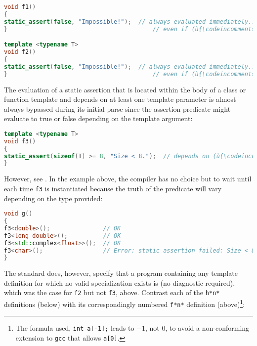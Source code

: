 \begin{lstlisting}[language=C++]
void f1()
{
static_assert(false, "Impossible!");  // always evaluated immediately...
}                                         // even if (ù{\codeincomments{f1()}}ù) is never invoked

template <typename T>
void f2()
{
static_assert(false, "Impossible!");  // always evaluated immediately...
}                                         // even if (ù{\codeincomments{f2()}}ù) is never instantiated
\end{lstlisting}

\noindent The evaluation of a static assertion that is located within the
body of a class or function template and depends on at least one
template parameter is almost always bypassed during its initial parse since
the assertion predicate might evaluate to true or false depending on the template argument:

\begin{lstlisting}[language=C++]
template <typename T>
void f3()
{
static_assert(sizeof(T) >= 8, "Size < 8.");  // depends on (ù{\codeincomments{T}}ù)
}
\end{lstlisting}

\noindent However, see
.
In the example above, the compiler has no choice but to wait until each
time \lstinline!f3! is instantiated because the truth of the predicate will
vary depending on the type provided:

\begin{lstlisting}[language=C++]
void g()
{
f3<double>();               // OK
f3<long double>();          // OK
f3<std::complex<float>>();  // OK
f3<char>();                 // Error: static assertion failed: Size < 8.
}
\end{lstlisting}

\noindent The standard does, however, specify that a program containing any
template definition for which no valid specialization exists is
 (no diagnostic required), which was the case for
\lstinline!f2! but not \lstinline!f3!, above. Contrast each of the
\lstinline!h*!\lstinline[basicstyle=\ttfamily\itshape]!n!\lstinline!*! definitions (below) with its correspondingly numbered
\lstinline!f*!\lstinline[basicstyle=\ttfamily\itshape]!n!\lstinline!*!  definition (above)\footnote{The formula used, \lstinline!int!~\lstinline!a[-1];! leads to $-1$, not $0$, to avoid a non-conforming extension to \lstinline!gcc! that allows \lstinline!a[0]!.}:


